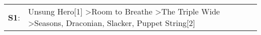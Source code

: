 \begin{supertabular}{p{0.03\textwidth}p{0.92\textwidth}}
 \textbf{S1}:  &  Unsung Hero[1]\textsuperscript{} \textgreater \enspace Room to Breathe\textsuperscript{} \textgreater \enspace The Triple Wide\textsuperscript{} \textgreater \enspace Seasons\textsuperscript{}, \enspace Draconian\textsuperscript{}, \enspace Slacker\textsuperscript{}, \enspace Puppet String[2]\textsuperscript{}  \enspace  \\
\end{supertabular}
